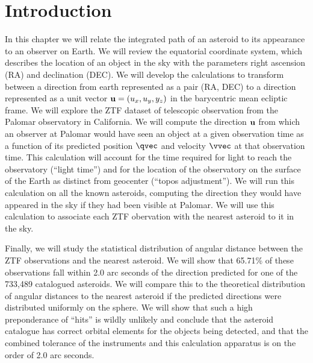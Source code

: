 \section{Introduction}
\label{section_intro}
In this chapter we will relate the integrated path of an asteroid to its appearance to an observer on Earth.
We will review the equatorial coordinate system, which describes the location of an object in the sky 
with the parameters right ascension (RA) and declination (DEC).
We will develop the calculations to transform between a direction from earth represented as a pair (RA, DEC)
to a direction represented as a unit vector $\mathbf{u} = (u_x, u_y, y_z)$ in the barycentric mean ecliptic frame.
We will explore the ZTF dataset of telescopic observation from the Palomar observatory in California.
We will compute the direction $\mathbf{u}$ from which an observer at Palomar would have seen an object at a given observation time
as a function of its predicted position $\qvec$ and velocity $\vvec$ at that observation time.
This calculation will account for the time required for light to reach the observatory (``light time'')
and for the location of the observatory on the surface of the Earth as distinct from geocenter (``topos adjustment'').
We will run this calculation on all the known asteroids, computing the direction they would have appeared in the sky if they had been visible at Palomar.
We will use this calculation to associate each ZTF obervation with the nearest asteroid to it in the sky.

Finally, we will study the statistical distribution of angular distance between the ZTF observations and the nearest asteroid.
We will show that 65.71\% of these observations fall within 2.0 arc seconds of the direction predicted for one of the 733,489 catalogued asteroids.
We will compare this to the theoretical distribution of angular distances to the nearest asteroid 
if the predicted directions were distributed uniformly on the sphere.
We will show that such a high preponderance of ``hits'' is wildly unlikely and conclude that the asteroid catalogue 
has correct orbital elements for the objects being detected, 
and that the combined tolerance of the instruments and this calculation apparatus is on the order of 2.0 arc seconds.

